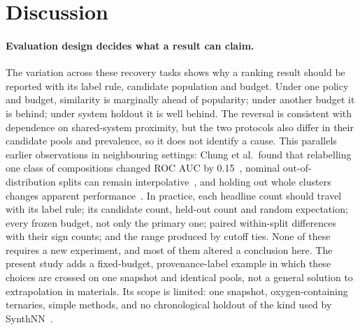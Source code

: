 \documentclass[11pt,a4paper]{article}
\begin{document}
\section{Discussion}

\paragraph{Evaluation design decides what a result can claim.}
The variation across these recovery tasks shows why a ranking result should be reported with its label rule, candidate population and budget. Under one policy and budget, similarity is marginally ahead of popularity; under another budget it is behind; under system holdout it is well behind. The reversal is consistent with dependence on shared-system proximity, but the two protocols also differ in their candidate pools and prevalence, so it does not identify a cause. This parallels earlier observations in neighbouring settings: Chung et al.\ found that relabelling one class of compositions changed ROC AUC by 0.15~\citep{chung2025}, nominal out-of-distribution splits can remain interpolative~\citep{li2025}, and holding out whole clusters changes apparent performance~\citep{meredig2018}. In practice, each headline count should travel with its label rule; its candidate count, held-out count and random expectation; every frozen budget, not only the primary one; paired within-split differences with their sign counts; and the range produced by cutoff ties. None of these requires a new experiment, and most of them altered a conclusion here. The present study adds a fixed-budget, provenance-label example in which these choices are crossed on one snapshot and identical pools, not a general solution to extrapolation in materials. Its scope is limited: one snapshot, oxygen-containing ternaries, simple methods, and no chronological holdout of the kind used by SynthNN~\citep{antoniuk2023}.
\end{document}
